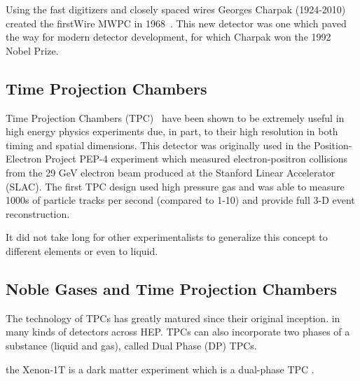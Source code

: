 Using the fast digitizers and closely spaced wires Georges Charpak (1924-2010) created the firstWire MWPC in 1968~\citep{Charpak:1968kd}.
This new detector was one which paved the way for modern detector development, for which Charpak won the 1992 Nobel Prize.


\subsection{Time Projection Chambers}

Time Projection Chambers (TPC)~\citep{lartpc:nygren} have been shown to be extremely useful in high energy physics experiments due, in part, to their high resolution in both timing and spatial dimensions.
This detector was originally used in the Position-Electron Project PEP-4 experiment which measured electron-positron collisions from the 29 GeV electron beam produced at the Stanford Linear Accelerator (SLAC).
The first TPC design used high pressure gas and was able to measure 1000s of particle tracks per second (compared to 1-10) and provide full 3-D event reconstruction.

It did not take long for other experimentalists to generalize this concept to different elements or even to liquid.


\subsection{Noble Gases and Time Projection Chambers}

The technology of TPCs has greatly matured since their original inception.
in many kinds of detectors across HEP. TPCs can also incorporate two phases of a substance (liquid and gas), called Dual Phase (DP) TPCs.

the Xenon-1T is a dark matter experiment which is a dual-phase TPC \citep{Aprile_2017_xenon1T}.

